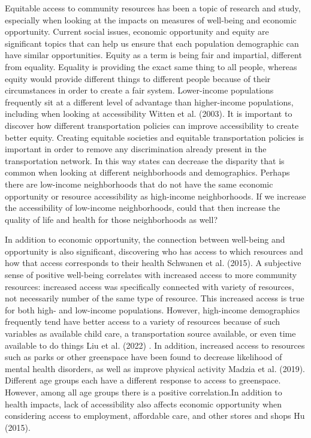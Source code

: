 \documentclass[
  letterpaper,
  DIV=11,
  numbers=noendperiod]{scrreport}
\begin{document}
Equitable access to community resources has been a topic of research and
study, especially when looking at the impacts on measures of well-being
and economic opportunity. Current social issues, economic opportunity
and equity are significant topics that can help us ensure that each
population demographic can have similar opportunities. Equity as a term
is being fair and impartial, different from equality. Equality is
providing the exact same thing to all people, whereas equity would
provide different things to different people because of their
circumstances in order to create a fair system. Lower-income populations
frequently sit at a different level of advantage than higher-income
populations, including when looking at accessibility Witten et al.
(2003). It is important to discover how different transportation
policies can improve accessibility to create better equity. Creating
equitable societies and equitable transportation policies is important
in order to remove any discrimination already present in the
transportation network. In this way states can decrease the disparity
that is common when looking at different neighborhoods and demographics.
Perhaps there are low-income neighborhoods that do not have the same
economic opportunity or resource accessibility as high-income
neighborhoods. If we increase the accessibility of low-income
neighborhoods, could that then increase the quality of life and health
for those neighborhoods as well?

In addition to economic opportunity, the connection between well-being
and opportunity is also significant, discovering who has access to which
resources and how that access corresponds to their health Schwanen et
al. (2015). A subjective sense of positive well-being correlates with
increased access to more community resources: increased access was
specifically connected with variety of resources, not necessarily number
of the same type of resource. This increased access is true for both
high- and low-income populations. However, high-income demographics
frequently tend have better access to a variety of resources because of
such variables as available child care, a transportation source
available, or even time available to do things Liu et al. (2022) . In
addition, increased access to resources such as parks or other
greenspace have been found to decrease likelihood of mental health
disorders, as well as improve physical activity Madzia et al. (2019).
Different age groups each have a different response to access to
greenspace. However, among all age groups there is a positive
correlation.In addition to health impacts, lack of accessibility also
affects economic opportunity when considering access to employment,
affordable care, and other stores and shops Hu (2015).
\end{document}
